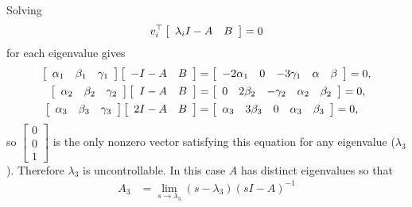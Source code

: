 \documentclass{article}
\begin{document}
\begin{itemize}
{    Solving
    $$
    v_i^\top \left[\begin{array}{c c}
                \lambda_i I - A & B
              \end{array}\right] = 0
    $$
    for each eigenvalue gives
    \begin{align*}
      \left[\begin{array}{c c c}
        \alpha_1 & \beta_1 & \gamma_1
      \end{array}\right]
      \left[\begin{array}{c c}
        -I - A & B
      \end{array}\right] &=
      \left[\begin{array}{r r r r r}
        -2 \alpha_1 & 0 & -3 \gamma_1 & \alpha & \beta
      \end{array}\right] = 0, \\
      \left[\begin{array}{c c c}
        \alpha_2 & \beta_2 & \gamma_2
      \end{array}\right]
      \left[\begin{array}{c c}
        I - A & B
      \end{array}\right] &=
      \left[\begin{array}{r r r r r}
        0 & 2\beta_2 & -\gamma_2 & \alpha_2 & \beta_2
      \end{array}\right] = 0, \\
      \left[\begin{array}{c c c}
        \alpha_3 & \beta_3 & \gamma_3
      \end{array}\right]
      \left[\begin{array}{c c}
        2I - A & B
      \end{array}\right] &=
      \left[\begin{array}{r r r r r}
        \alpha_3 & 3\beta_3 & 0 & \alpha_3 & \beta_3
      \end{array}\right] = 0,
    \end{align*}
    so
    $\left[\begin{array}{c}
       0 \\ 0 \\ 1
     \end{array}\right]$
    is the only nonzero vector satisfying this equation for any
    eigenvalue ($\lambda_3$). Therefore $\lambda_3$ is
    uncontrollable. In this case $A$ has distinct eigenvalues so that
    \begin{align*}
    A_3 &= \lim_{s \to \lambda_3} (s - \lambda_3)(sI - A)^{-1} \\

\end{align*}}
\end{itemize}
\end{document}

